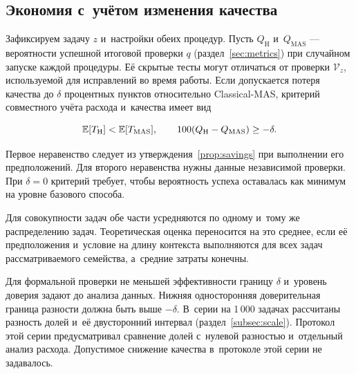 \subsection{Экономия с~учётом изменения качества}
Зафиксируем задачу $z$ и~настройки обеих процедур. Пусть $Q_{\mathrm{H}}$ и~$Q_{\mathrm{MAS}}$ --- вероятности успешной итоговой проверки $q$ (раздел~\ref{sec:metrics}) при случайном запуске каждой процедуры. Её скрытые тесты могут отличаться от проверки $\mathcal{V}_z$, используемой для исправлений во время работы. Если допускается потеря качества до $\delta$ процентных пунктов относительно Classical-MAS, критерий совместного учёта расхода и~качества имеет вид
\begin{formulakey}
\begin{equation}
\mathbb{E}[T_{\mathrm{H}}]<\mathbb{E}[T_{\mathrm{MAS}}],\qquad 100(Q_{\mathrm{H}}-Q_{\mathrm{MAS}})\ge -\delta.
\label{eq:joint-criterion}
\end{equation}
\begin{symbols}
\end{symbols}
\end{formulakey}
Первое неравенство следует из утверждения~\ref{prop:savings} при выполнении его предположений. Для второго неравенства нужны данные независимой проверки. При $\delta=0$ критерий требует, чтобы вероятность успеха оставалась как минимум на уровне базового способа.

Для совокупности задач обе части усредняются по одному и~тому же распределению задач. Теоретическая оценка переносится на это среднее, если её предположения и~условие на длину контекста выполняются для всех задач рассматриваемого семейства, а~средние затраты конечны.

Для формальной проверки не меньшей эффективности границу $\delta$ и~уровень доверия задают до анализа данных. Нижняя односторонняя доверительная граница разности должна быть выше $-\delta$. В~серии на 1\,000 задачах рассчитаны разность долей и~её двусторонний интервал (раздел~\ref{subsec:scale}). Протокол этой серии предусматривал сравнение долей с~нулевой разностью и~отдельный анализ расхода. Допустимое снижение качества в~протоколе этой серии не задавалось.

